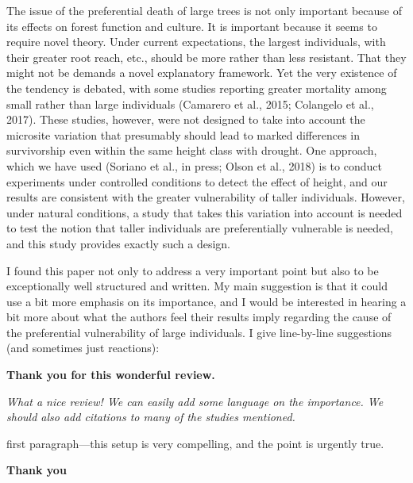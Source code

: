 \documentclass[
]{article}
\begin{document}
The issue of the preferential death of large trees is not only important
because of its effects on forest function and culture. It is important
because it seems to require novel theory. Under current expectations,
the largest individuals, with their greater root reach, etc., should be
more rather than less resistant. That they might not be demands a novel
explanatory framework. Yet the very existence of the tendency is
debated, with some studies reporting greater mortality among small
rather than large individuals (Camarero et al., 2015; Colangelo et al.,
2017). These studies, however, were not designed to take into account
the microsite variation that presumably should lead to marked
differences in survivorship even within the same height class with
drought. One approach, which we have used (Soriano et al., in press;
Olson et al., 2018) is to conduct experiments under controlled
conditions to detect the effect of height, and our results are
consistent with the greater vulnerability of taller individuals.
However, under natural conditions, a study that takes this variation
into account is needed to test the notion that taller individuals are
preferentially vulnerable is needed, and this study provides exactly
such a design.

I found this paper not only to address a very important point but also
to be exceptionally well structured and written. My main suggestion is
that it could use a bit more emphasis on its importance, and I would be
interested in hearing a bit more about what the authors feel their
results imply regarding the cause of the preferential vulnerability of
large individuals. I give line-by-line suggestions (and sometimes just
reactions):

\textbf{Thank you for this wonderful review.}

\emph{What a nice review! We can easily add some language on the
importance. We should also add citations to many of the studies
mentioned.}

first paragraph---this setup is very compelling, and the point is
urgently true.

\textbf{Thank you}
\end{document}
